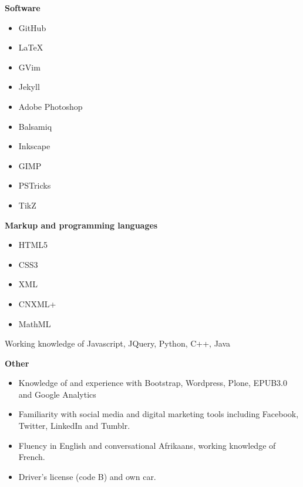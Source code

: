 \documentclass[]{friggeri-cv} %
\begin{document}
\textbf{Software}
\begin{multicols}{2}
\begin{itemize}
 \item GitHub
 \item LaTeX
 \item GVim
 \item Jekyll
  \item Adobe Photoshop
 \item Balsamiq
 \item Inkscape
 \item GIMP
 \item PSTricks
 \item TikZ
\end{itemize}
\end{multicols}

\textbf{Markup and programming languages}
\begin{itemize}
 \item HTML5
 \item CSS3
 \item XML
 \item CNXML+
 \item MathML
 \end{itemize}
Working knowledge of Javascript, JQuery, Python, C++, Java

\textbf{Other}
\begin{itemize}
\item Knowledge of and experience with Bootstrap, Wordpress, Plone, EPUB3.0 and Google Analytics
 \item Familiarity with social media and digital marketing tools including Facebook, Twitter, LinkedIn and Tumblr.
 \item Fluency in English and conversational Afrikaans, working knowledge of French.
 \item Driver's license (code B) and own car.
\end{itemize}

\pagebreak
\end{document}
